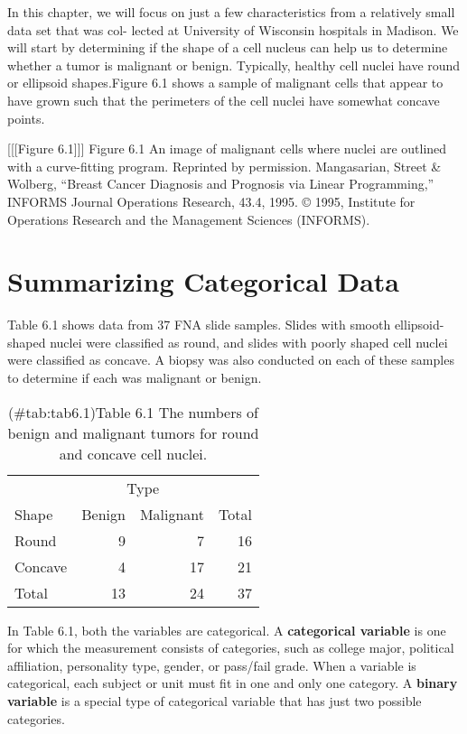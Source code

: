 \documentclass[
]{report}
\begin{document}
In this chapter, we will focus on just a few characteristics from a relatively small data set that was col-
lected at University of Wisconsin hospitals in Madison. We will start by determining if the shape of a cell
nucleus can help us to determine whether a tumor is malignant or benign.
Typically, healthy cell nuclei have round or ellipsoid shapes.Figure 6.1 shows a sample of malignant cells that appear to have grown such that the perimeters of the cell nuclei have somewhat concave points.

{[}{[}{[}Figure 6.1{]}{]}{]}
Figure 6.1 An image of malignant cells where nuclei are outlined with a curve-fitting program. Reprinted by permission. Mangasarian, Street \& Wolberg, ``Breast Cancer Diagnosis and Prognosis via Linear Programming,'' INFORMS Journal Operations Research, 43.4, 1995. © 1995, Institute for Operations Research and the Management Sciences (INFORMS).

\section{\texorpdfstring{\textbf{Summarizing Categorical Data}}{Summarizing Categorical Data}}\label{summarizing-categorical-data}

Table 6.1 shows data from 37 FNA slide samples. Slides with smooth ellipsoid-shaped nuclei were classified
as round, and slides with poorly shaped cell nuclei were classified as concave. A biopsy was also conducted
on each of these samples to determine if each was malignant or benign.

\begin{table}[H]
\centering
\caption{(\#tab:tab6.1)Table 6.1 The numbers of benign and malignant tumors for round and concave cell nuclei.}
\centering
\begin{tabular}[t]{lrrr}
\toprule
\multicolumn{1}{c}{ } & \multicolumn{2}{c}{Type} & \multicolumn{1}{c}{ } \\
\cmidrule(l{3pt}r{3pt}){2-3}
Shape & Benign & Malignant & Total\\
\midrule
Round & 9 & 7 & 16\\
Concave & 4 & 17 & 21\\
Total & 13 & 24 & 37\\
\bottomrule
\end{tabular}
\end{table}

In Table 6.1, both the variables are categorical. A \textbf{categorical variable} is one for which the measurement
consists of categories, such as college major, political affiliation, personality type, gender, or pass/fail grade.
When a variable is categorical, each subject or unit must fit in one and only one category. A \textbf{binary variable}
is a special type of categorical variable that has just two possible categories.
\end{document}
